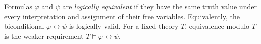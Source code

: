 
Formulas $\varphi$ and $\psi$ are \emph{logically equivalent} if they have the same truth value under every interpretation and assignment of their free variables. Equivalently, the biconditional $\varphi\leftrightarrow\psi$ is logically valid. For a fixed theory $T$, equivalence modulo $T$ is the weaker requirement $T\models\varphi\leftrightarrow\psi$.
